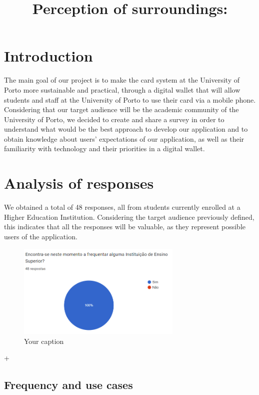 \documentclass{article}
\begin{document}
\title{Perception of surroundings:}
\maketitle

\section{Introduction}

The main goal of our project is to make the card system at the University of Porto more sustainable and practical, through a digital wallet that will allow students and staff at the University of Porto to use their card via a mobile phone.
Considering that our target audience will be the academic community of the University of Porto, we decided to create and share a survey in order to understand what would be the best approach to develop our application and
to obtain knowledge about users' expectations of our application, as well as their familiarity with technology and their priorities in a digital wallet.

\section{Analysis of responses}


We obtained a total of 48 responses, all from students currently enrolled at a Higher Education Institution. Considering the target audience previously defined, this indicates that all the responses will be valuable, as they represent possible users of the application.

\begin{figure}[h]
    \centering
    \includegraphics[width=0.7\textwidth]{images/questionaire1.png}
    \caption{Your caption}
\end{figure}


+
\subsection{Frequency and use cases}
\end{document}
